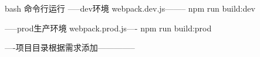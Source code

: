 bash 命令行运行
-----dev环境  webpack.dev.js--------
npm run build:dev     

-----prod生产环境 webpack.prod.js----
npm run build:prod

----项目目录根据需求添加--------------